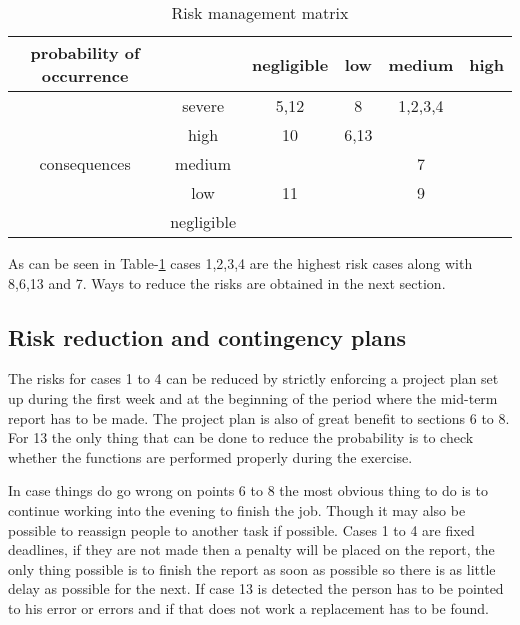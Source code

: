 \begin{table}
	\centering
		\begin{tabular}{c|c||c|c|c|c|}
		probability of occurrence &  & negligible & low & medium & high \\ \hline \hline
		 & severe & 5,12 & 8 & 1,2,3,4 &  \\ \hline
		 & high & 10 & 6,13 &  &  \\ \hline
		consequences & medium & & & 7 & \\ \hline
		 & low & 11 & & 9 & \\ \hline
		 & negligible & & & & \\
		\hline
	\end{tabular}
	\caption{Risk management matrix}
	\label{sec:Riskmanagementmatrix}
\end{table}

As can be seen in Table-\ref{sec:Riskmanagementmatrix} cases 1,2,3,4 are the highest risk cases along with 8,6,13 and 7. Ways to reduce the risks are obtained in the next section.

\subsection{Risk reduction and contingency plans}
The risks for cases 1 to 4 can be reduced by strictly enforcing a project plan set up during the first week and at the beginning of the period where the mid-term report has to be made. The project plan is also of great benefit to sections 6 to 8. For 13 the only thing that can be done to reduce the probability is to check whether the functions are performed properly during the exercise.

In case things do go wrong on points 6 to 8 the most obvious thing to do is to continue working into the evening to finish the job. Though it may also be possible to reassign people to another task if possible. Cases 1 to 4 are fixed deadlines, if they are not made then a penalty will be placed on the report, the only thing possible is to finish the report as soon as possible so there is as little delay as possible for the next. If case 13 is detected the person has to be pointed to his error or errors and if that does not work a replacement has to be found.